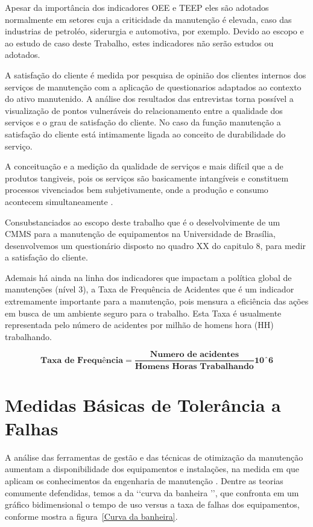 Apesar da importância dos indicadores OEE e TEEP eles são adotados normalmente em setores cuja a criticidade da manutenção é elevada, caso das industrias de petroléo, siderurgia e automotiva, por exemplo. Devido ao escopo e ao estudo de caso deste Trabalho, estes indicadores não serão estudos ou adotados.

A satisfação do cliente é medida por pesquisa de opinião dos clientes internos dos serviços de manutenção com a aplicação de questionarios adaptados ao contexto do ativo manutenido. A análise dos resultados das entrevistas torna possível a visualização de pontos vulneráveis do  relacionamento entre a qualidade dos serviços e o grau de satisfação do cliente. No caso da função manutenção a satisfação do cliente está intimamente ligada ao conceito de durabilidade do serviço.

A conceituação e a medição da qualidade de serviços e mais difícil que a de produtos tangiveis, pois os serviços são basicamente intangíveis e constituem processos vivenciados bem subjetivamente, onde a produção e consumo acontecem simultaneamente \cite{junior2012satisfaccao}.

Consubstanciados ao escopo deste trabalho que é o deselvolvimente de um CMMS para a manutenção de equipamentos na Universidade de Brasília, desenvolvemos um questionário disposto no quadro XX do capitulo 8, para medir a satisfação do cliente.

Ademais há ainda na linha dos indicadores que impactam a política global de manutenções (nível 3), a Taxa de Frequência de Acidentes que é um indicador extremamente importante para a manutenção, pois mensura a eficiência das ações em busca de um ambiente seguro para o trabalho. Esta Taxa é usualmente representada pelo número de acidentes por milhão de homens hora (HH) trabalhando.

\begin{equation}
\label{eqn06}
	\mathbf{\textrm{Taxa de Frequência}} = \mathbf{\frac{\textrm{Numero de acidentes}}{\textrm{Homens Horas Trabalhando}}{10ˆ6}} 
\end{equation}

\section{Medidas Básicas de Tolerância a Falhas}
\label{falhas}

A análise das ferramentas de gestão e das técnicas de otimização da manutenção aumentam a disponibilidade dos equipamentos e instalações, na medida em que aplicam os conhecimentos da engenharia de manutenção \cite{xenos1998gerenciando}. Dentre as teorias comumente defendidas, temos a da \lq\lq curva da banheira \rq\rq, que confronta em um gráfico bidimensional o tempo de uso versus a taxa de falhas dos equipamentos, conforme mostra a figura~\ref{Curva da banheira}.

